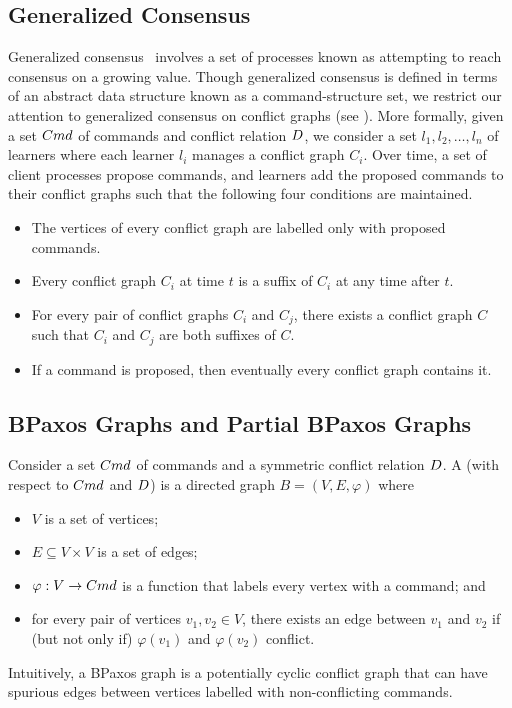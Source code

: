 \subsection{Generalized Consensus}
Generalized consensus~\cite{lamport1998part, sutra2011fast} involves a set of
processes known as  attempting to reach consensus on a
growing value. Though generalized consensus is defined in terms of an abstract
data structure known as a command-structure set, we restrict our attention to
generalized consensus on conflict graphs (see ). More
formally, given a set $Cmd$ of commands and conflict relation $D$, we
consider a set $l_1, l_2, \ldots, l_n$ of learners where each learner $l_i$
manages a conflict graph $C_i$. Over time, a set of client processes propose
commands, and learners add the proposed commands to their conflict graphs such
that the following four conditions are maintained.
\begin{itemize}
  \item {}
    The vertices of every conflict graph are labelled only with proposed
    commands.
  \item {}
    Every conflict graph $C_i$ at time $t$ is a suffix of $C_i$ at any time after
    $t$.
  \item {}
    For every pair of conflict graphs $C_i$ and $C_j$, there exists a conflict
    graph $C$ such that $C_i$ and $C_j$ are both suffixes of $C$.
  \item {}
    If a command is proposed, then eventually every conflict graph contains it.
\end{itemize}



\subsection{BPaxos Graphs and Partial BPaxos Graphs}
Consider a set $Cmd$ of commands and a symmetric conflict relation
$D$. A  (with respect to $Cmd$ and $D$)
is a directed graph $B = (V, E, \varphi)$ where
\begin{itemize}
  \item
    $V$ is a set of vertices;
  \item
    $E \subseteq V \times V$ is a set of edges;
  \item
    $\varphi: V \to Cmd$ is a function that labels every vertex with a
    command; and
  \item
    for every pair of vertices $v_1, v_2 \in V$, there exists an edge between
    $v_1$ and $v_2$ if (but not only if) $\varphi(v_1)$ and $\varphi(v_2)$
    conflict.
\end{itemize}
Intuitively, a BPaxos graph is a potentially cyclic conflict graph that can
have spurious edges between vertices labelled with non-conflicting commands.


